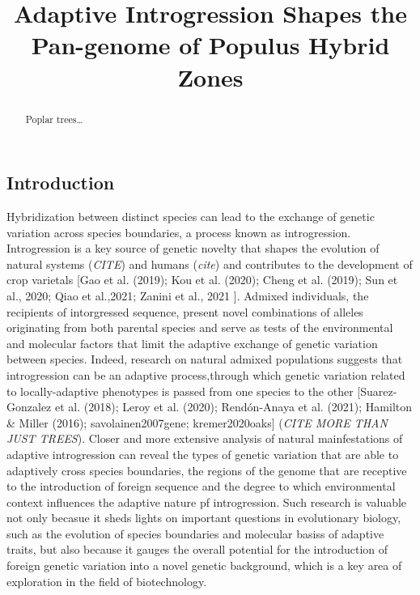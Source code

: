 \documentclass[
]{agujournal2019}
\begin{document}
\title{Adaptive Introgression Shapes the Pan-genome of Populus Hybrid
Zones}




\begin{abstract}
Poplar trees\ldots{}
\end{abstract}





\subsection{Introduction}\label{introduction}

Hybridization between distinct species can lead to the exchange of
genetic variation across species boundaries, a process known as
introgression. Introgression is a key source of genetic novelty that
shapes the evolution of natural systems (\emph{CITE}) and humans
(\emph{cite}) and contributes to the development of crop varietals
{[}Gao et al. (2019); Kou et al. (2020); Cheng et al. (2019); Sun et
al., 2020; Qiao et al.,2021; Zanini et al., 2021 {]}. Admixed
individuals, the recipients of intorgressed sequence, present novel
combinations of alleles originating from both parental species and serve
as tests of the environmental and molecular factors that limit the
adaptive exchange of genetic variation between species. Indeed, research
on natural admixed populations suggests that introgression can be an
adaptive process,through which genetic variation related to
locally-adaptive phenotypes is passed from one species to the other
{[}Suarez-Gonzalez et al. (2018); Leroy et al. (2020); Rendón-Anaya et
al. (2021); Hamilton \& Miller (2016); savolainen2007gene;
kremer2020oaks{]} (\emph{CITE MORE THAN JUST TREES}). Closer and more
extensive analysis of natural mainfestations of adaptive introgression
can reveal the types of genetic variation that are able to adaptively
cross species boundaries, the regions of the genome that are receptive
to the introduction of foreign sequence and the degree to which
environmental context influences the adaptive nature pf introgression.
Such research is valuable not only becasue it sheds lights on important
questions in evolutionary biology, such as the evolution of species
boundaries and molecular basiss of adaptive traits, but also because it
gauges the overall potential for the introduction of foreign genetic
variation into a novel genetic background, which is a key area of
exploration in the field of biotechnology.
\end{document}
